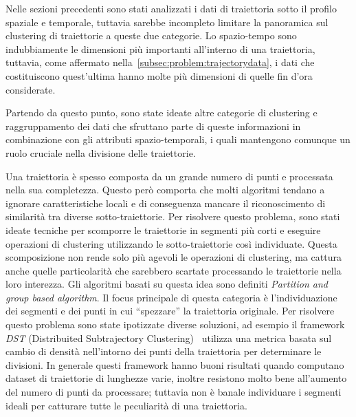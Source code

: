 Nelle sezioni precedenti sono stati analizzati i dati di traiettoria sotto il profilo
spaziale e temporale, tuttavia sarebbe incompleto limitare la panoramica sul clustering di traiettorie
a queste due categorie.
Lo spazio-tempo sono indubbiamente le dimensioni più importanti all'interno di una traiettoria,
tuttavia, come affermato nella~\cref{subsec:problem:trajectorydata},
i dati che costituiscono quest'ultima hanno molte più dimensioni di quelle fin d'ora considerate.

Partendo da questo punto, sono state ideate altre categorie di clustering e raggruppamento dei dati
che sfruttano parte di queste informazioni in combinazione con gli attributi spazio-temporali,
i quali mantengono comunque un ruolo cruciale nella divisione delle traiettorie.

Una traiettoria è spesso composta da un grande numero di punti e processata nella sua completezza.
Questo però comporta che molti algoritmi tendano a ignorare caratteristiche locali
e di conseguenza mancare il riconoscimento di similarità tra diverse sotto-traiettorie.
Per risolvere questo problema, sono stati ideate tecniche per scomporre le traiettorie in segmenti più corti
e eseguire operazioni di clustering utilizzando le sotto-traiettorie così individuate.
Questa scomposizione non rende solo più agevoli le operazioni di clustering, ma cattura anche
quelle particolarità che sarebbero scartate processando le traiettorie nella loro interezza.
Gli algoritmi basati su questa idea sono definiti \textit{Partition and group based algorithm}.
Il focus principale di questa categoria è l'individuazione dei segmenti e
dei punti in cui ``spezzare'' la traiettoria originale.
Per risolvere questo problema sono state ipotizzate diverse soluzioni,
ad esempio il framework \textit{DST} (Distribuited Subtrajectory Clustering)~\cite{tampakis2019scalable} utilizza una metrica basata
sul cambio di densità nell'intorno dei punti della traiettoria per determinare le divisioni.
In generale questi framework hanno buoni risultati quando computano dataset di traiettorie
di lunghezze varie, inoltre resistono molto bene all'aumento del numero di punti da processare;
tuttavia non è banale individuare i segmenti ideali per catturare tutte le peculiarità
di una traiettoria.

